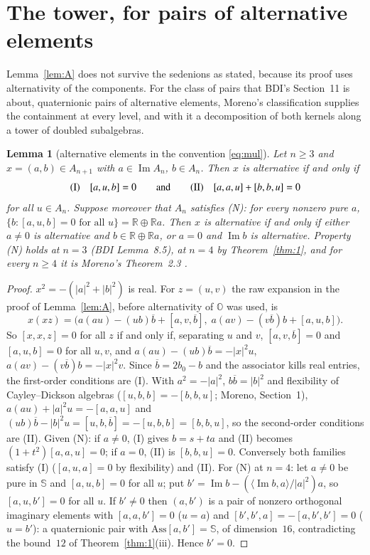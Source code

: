\documentclass{baustms}
\theoremstyle{cupthm}
\newtheorem{lemma}[thm]{Lemma}
\numberwithin{equation}{section}
\newcommand{\Ass}{\mathrm{Ass}}
\newcommand{\OO}{\mathbb{O}}
\newcommand{\RR}{\mathbb{R}}
\newcommand{\Sed}{\mathbb{S}}
\newcommand{\Imm}{\operatorname{Im}}
\begin{document}
\section{The tower, for pairs of alternative elements}\label{sec:tower}

Lemma~\ref{lem:A} does not survive the sedenions as stated, because its proof uses alternativity of the components. For the class of pairs that BDI's Section~11 is about, quaternionic pairs of alternative elements, Moreno's classification supplies the containment at every level, and with it a decomposition of both kernels along a tower of doubled subalgebras.

\begin{lemma}[alternative elements in the convention \eqref{eq:mul}]\label{lem:D}
Let $n\ge 3$ and $x=(a,b)\in A_{n+1}$ with $a\in\Imm A_n$, $b\in A_n$. Then $x$ is alternative if and only if
\begin{equation}
\text{\rm(I)}\quad [a,u,b]=0\qquad\text{and}\qquad\text{\rm(II)}\quad [a,a,u]+[b,b,u]=0
\label{eq:I}
\end{equation}
for all $u\in A_n$. Suppose moreover that $A_n$ satisfies {\rm(N)}: for every nonzero pure $a$, $\{b:[a,u,b]=0\text{ for all }u\}=\RR\oplus\RR a$. Then $x$ is alternative if and only if either $a\neq 0$ is alternative and $b\in\RR\oplus\RR a$, or $a=0$ and $\Imm b$ is alternative. Property {\rm(N)} holds at $n=3$ (BDI Lemma~8.5), at $n=4$ by Theorem~\ref{thm:1}, and for every $n\ge 4$ it is Moreno's Theorem~2.3 \cite{moreno}.
\end{lemma}

\begin{proof}
$x^2=-(|a|^2+|b|^2)$ is real. For $z=(u,v)$ the raw expansion in the proof of Lemma~\ref{lem:A}, before alternativity of $\OO$ was used, is
\[
x(xz)=\bigl(a(au)-(ub)\overline{b}+[a,v,\overline{b}],\; a(av)-(v\overline{b})b+[a,u,b]\bigr).
\]
So $[x,x,z]=0$ for all $z$ if and only if, separating $u$ and $v$, $[a,v,\overline{b}]=0$ and $[a,u,b]=0$ for all $u,v$, and $a(au)-(ub)\overline{b}=-|x|^2 u$, $a(av)-(v\overline{b})b=-|x|^2 v$. Since $\overline{b}=2b_0-b$ and the associator kills real entries, the first-order conditions are (I). With $a^2=-|a|^2$, $b\overline{b}=|b|^2$ and flexibility of Cayley--Dickson algebras ($[u,b,b]=-[b,b,u]$; Moreno, Section~1), $a(au)+|a|^2 u=-[a,a,u]$ and $(ub)\overline{b}-|b|^2 u=[u,b,\overline{b}]=-[u,b,b]=[b,b,u]$, so the second-order conditions are (II). Given (N): if $a\neq 0$, (I) gives $b=s+ta$ and (II) becomes $(1+t^2)[a,a,u]=0$; if $a=0$, (II) is $[b,b,u]=0$. Conversely both families satisfy (I) ($[a,u,a]=0$ by flexibility) and (II). For (N) at $n=4$: let $a\neq 0$ be pure in $\Sed$ and $[a,u,b]=0$ for all $u$; put $b'=\Imm b-(\langle\Imm b,a\rangle/|a|^2)a$, so $[a,u,b']=0$ for all $u$. If $b'\neq 0$ then $(a,b')$ is a pair of nonzero orthogonal imaginary elements with $[a,a,b']=0$ ($u=a$) and $[b',b',a]=-[a,b',b']=0$ ($u=b'$): a quaternionic pair with $\Ass[a,b']=\Sed$, of dimension~$16$, contradicting the bound~$12$ of Theorem~\ref{thm:1}(iii). Hence $b'=0$.
\end{proof}
\end{document}
